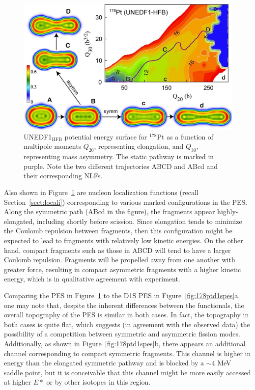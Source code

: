 \begin{figure}
	\centering
	\includegraphics[width=0.7\linewidth]{TeX_files/178Pt_unedf1_pes.jpg}
	\caption[UNEDF1$_\mathrm{HFB}$ potential energy surface for $^{178}$Pt as a function of multipole moments $Q_{20}$, representing elongation, and $Q_{30}$, representing mass asymmetry. The static pathway is marked in purple. Note the two different trajectories ABCD and ABcd and their corresponding NLFs.]{UNEDF1$_\mathrm{HFB}$ potential energy surface for $^{178}$Pt as a function of multipole moments $Q_{20}$, representing elongation, and $Q_{30}$, representing mass asymmetry. The static pathway is marked in purple. Note the two different trajectories ABCD and ABcd and their corresponding NLFs.}
	\label{fig:178ptunedf1pes}
\end{figure}

Also shown in Figure~\ref{fig:178ptunedf1pes} are nucleon localization functions (recall Section~\ref{sect:locali}) corresponding to various marked configurations in the PES. Along the symmetric path (ABcd in the figure), the fragments appear highly-elongated, including shortly before scission. Since elongation tends to minimize the Coulomb repulsion between fragments, then this configuration might be expected to lead to fragments with relatively low kinetic energies. On the other hand, compact fragments such as those in ABCD will tend to have a larger Coulomb repulsion. Fragments will be propelled away from one another with greater force, resulting in compact asymmetric fragments with a higher kinetic energy, which is in qualitative agreement with experiment.

Comparing the {\hfb} PES in Figure~\ref{fig:178ptunedf1pes} to the D1S PES in Figure~\ref{fig:178ptd1spes}a, one may note that, despite the inherent differences between the functionals, the overall topography of the PES is similar in both cases. In fact, the topography in both cases is quite flat, which suggests (in agreement with the observed data) the possibility of a competition between symmetric and asymmetric fission modes. Additionally, as shown in Figure~\ref{fig:178ptd1spes}b, there appears an additional channel corresponding to compact symmetric fragments. This channel is higher in energy than the elongated symmetric pathway and is blocked by a ${\sim}4$ MeV saddle point, but it is conceivable that this channel might be more easily accessed at higher $E*$ or by other isotopes in this region. %

